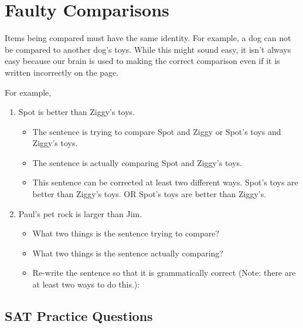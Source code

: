 \section{Faulty Comparisons}

Items being compared must have the same identity. For example, a dog can not be compared to another dog's toys. While this might sound easy, it isn't always easy because our brain is used to making the correct comparison even if it is written incorrectly on the page.

For example,

\begin{enumerate}
\item Spot is better than Ziggy's toys.

\begin{itemize}
\item The sentence is trying to compare Spot and Ziggy or Spot's toys and Ziggy's toys.
\item The sentence is actually comparing Spot and Ziggy's toys.
\item This sentence can be corrected at least two different ways. Spot's toys are better
than Ziggy's toys. OR Spot's toys are better than Ziggy's.
\end{itemize}

\item Paul's pet rock is larger than Jim.

\begin{itemize}
\item What two things is the sentence trying to compare? \hrulefill
\item What two things is the sentence actually comparing? \hrulefill
\item Re-write the sentence so that it is grammatically correct (Note: there are at least two
ways to do this.): \hrulefill
\end{itemize}
\end{enumerate}

\subsection{SAT Practice Questions}

